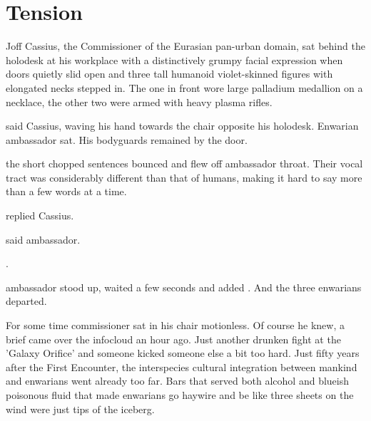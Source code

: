 \chapter{Tension}


Joff Cassius, the Commissioner of the Eurasian pan-urban domain, sat behind the holodesk at his workplace with a distinctively grumpy facial expression when doors quietly slid open and three tall humanoid violet-skinned figures with elongated necks stepped in. The one in front wore large palladium medallion on a necklace, the other two were armed with heavy plasma rifles.

 said Cassius, waving his hand towards the chair opposite his holodesk. Enwarian ambassador sat. His bodyguards remained by the door.

 the short chopped sentences bounced and flew off ambassador throat. Their vocal tract was considerably different than that of humans, making it hard to say more than a few words at a time.

 replied Cassius. 

 said ambassador.

.

 ambassador stood up, waited a few seconds and added . And the three enwarians departed.

For some time commissioner sat in his chair motionless. Of course he knew, a brief came over the infocloud an hour ago. Just another drunken fight at the 'Galaxy Orifice' and someone kicked someone else a bit too hard. Just fifty years after the First Encounter, the interspecies cultural integration between mankind and enwarians went already too far. Bars that served both alcohol and blueish poisonous fluid that made enwarians go haywire and be like three sheets on the wind were just tips of the iceberg.

